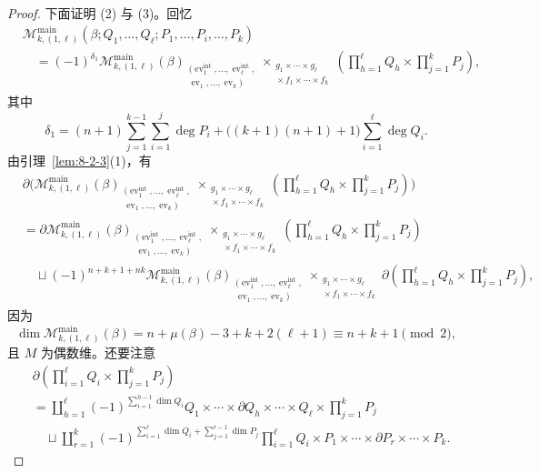 \begin{proof}
下面证明 (2) 与 (3)。回忆
\[
\begin{aligned}
&\mathcal M_{k,(1,\ell)}^{\mathrm{main}}
(\beta;Q_1,\ldots,Q_\ell;P_1,\ldots,P_i,\ldots,P_k)\\
&\quad={}
(-1)^{\delta_1}
\mathcal M_{k,(1,\ell)}^{\mathrm{main}}(\beta)_
{\substack{(\operatorname{ev}_1^{\mathrm{int}},\ldots,
\operatorname{ev}_\ell^{\mathrm{int}},\\
\operatorname{ev}_1,\ldots,\operatorname{ev}_k)}}
\mathop{\times}_{\substack{g_1\times\cdots\times g_\ell\\
{}\times f_1\times\cdots\times f_k}}
\left(\prod_{h=1}^{\ell}Q_h\times\prod_{j=1}^{k}P_j\right),
\end{aligned}
\]
其中
\[
 \delta_1=(n+1)\sum_{j=1}^{k-1}\sum_{i=1}^{j}\deg P_i
 +\bigl((k+1)(n+1)+1\bigr)\sum_{i=1}^{\ell}\deg Q_i.
\]
由引理~\ref{lem:8-2-3}(1)，有
\begingroup
\small
\[
\begin{aligned}
&\partial\Bigg(
\mathcal M_{k,(1,\ell)}^{\mathrm{main}}(\beta)_
{\substack{(\operatorname{ev}_1^{\mathrm{int}},\ldots,
\operatorname{ev}_\ell^{\mathrm{int}},\\
\operatorname{ev}_1,\ldots,\operatorname{ev}_k)}}
\mathop{\times}_{\substack{g_1\times\cdots\times g_\ell\\
{}\times f_1\times\cdots\times f_k}}
\left(\prod_{h=1}^{\ell}Q_h\times\prod_{j=1}^{k}P_j\right)\Bigg)\\
&={}
\partial\mathcal M_{k,(1,\ell)}^{\mathrm{main}}(\beta)_
{\substack{(\operatorname{ev}_1^{\mathrm{int}},\ldots,
\operatorname{ev}_\ell^{\mathrm{int}},\\
\operatorname{ev}_1,\ldots,\operatorname{ev}_k)}}
\mathop{\times}_{\substack{g_1\times\cdots\times g_\ell\\
{}\times f_1\times\cdots\times f_k}}
\left(\prod_{h=1}^{\ell}Q_h\times\prod_{j=1}^{k}P_j\right)\\
&\quad\sqcup(-1)^{n+k+1+nk}
\mathcal M_{k,(1,\ell)}^{\mathrm{main}}(\beta)_
{\substack{(\operatorname{ev}_1^{\mathrm{int}},\ldots,
\operatorname{ev}_\ell^{\mathrm{int}},\\
\operatorname{ev}_1,\ldots,\operatorname{ev}_k)}}
\mathop{\times}_{\substack{g_1\times\cdots\times g_\ell\\
{}\times f_1\times\cdots\times f_k}}
\partial\left(\prod_{h=1}^{\ell}Q_h\times\prod_{j=1}^{k}P_j\right),
\end{aligned}
\]
\endgroup
因为
\[
 \dim\mathcal M_{k,(1,\ell)}^{\mathrm{main}}(\beta)
 =n+\mu(\beta)-3+k+2(\ell+1)
 \equiv n+k+1\pmod2,
\]
且 $M$ 为偶数维。还要注意
\begingroup
\small
\[
\begin{aligned}
&\partial\left(\prod_{i=1}^{\ell}Q_i\times\prod_{j=1}^{k}P_j\right)\\
&={}
\coprod_{h=1}^{\ell}
(-1)^{\sum_{i=1}^{h-1}\dim Q_i}
Q_1\times\cdots\times\partial Q_h\times\cdots\times Q_\ell
\times\prod_{j=1}^{k}P_j\\
&\quad\sqcup
\coprod_{r=1}^{k}
(-1)^{\sum_{i=1}^{\ell}\dim Q_i+
\sum_{j=1}^{r-1}\dim P_j}
\prod_{i=1}^{\ell}Q_i\times
P_1\times\cdots\times\partial P_r\times\cdots\times P_k.
\end{aligned}
\]
\endgroup


\end{proof}

